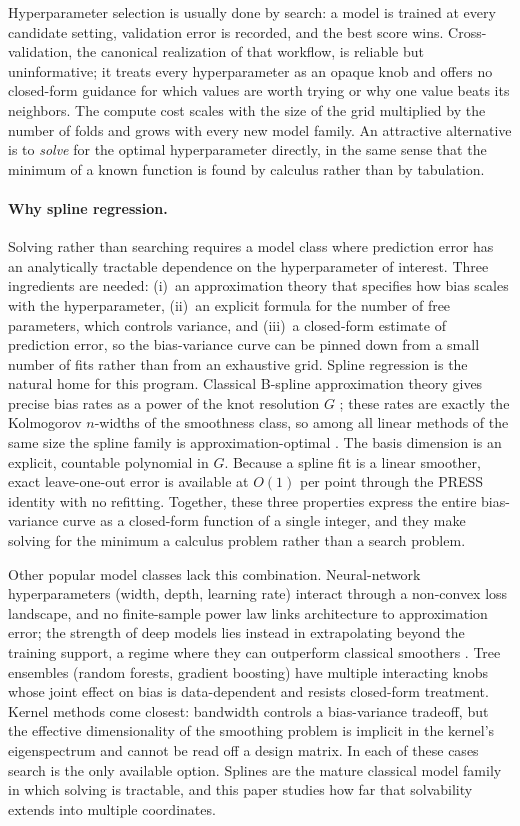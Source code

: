 \documentclass{article}
\begin{document}
Hyperparameter selection is usually done by search: a model is trained at every candidate setting, validation error is recorded, and the best score wins. Cross-validation, the canonical realization of that workflow, is reliable but uninformative; it treats every hyperparameter as an opaque knob and offers no closed-form guidance for which values are worth trying or why one value beats its neighbors. The compute cost scales with the size of the grid multiplied by the number of folds and grows with every new model family. An attractive alternative is to \emph{solve} for the optimal hyperparameter directly, in the same sense that the minimum of a known function is found by calculus rather than by tabulation.

\paragraph{Why spline regression.}
Solving rather than searching requires a model class where prediction error has an analytically tractable dependence on the hyperparameter of interest. Three ingredients are needed: (i)~an approximation theory that specifies how bias scales with the hyperparameter, (ii)~an explicit formula for the number of free parameters, which controls variance, and (iii)~a closed-form estimate of prediction error, so the bias-variance curve can be pinned down from a small number of fits rather than from an exhaustive grid. Spline regression is the natural home for this program. Classical B-spline approximation theory gives precise bias rates as a power of the knot resolution $G$ \citep{deboor2001,schumaker2007}; these rates are exactly the Kolmogorov $n$-widths of the smoothness class, so among all linear methods of the same size the spline family is approximation-optimal \citep{kolmogorov1936,melkman1978,pinkus1985}. The basis dimension is an explicit, countable polynomial in $G$. Because a spline fit is a linear smoother, exact leave-one-out error is available at $O(1)$ per point through the PRESS identity \citep{allen1974} with no refitting. Together, these three properties express the entire bias-variance curve as a closed-form function of a single integer, and they make solving for the minimum a calculus problem rather than a search problem.

Other popular model classes lack this combination. Neural-network hyperparameters (width, depth, learning rate) interact through a non-convex loss landscape, and no finite-sample power law links architecture to approximation error; the strength of deep models lies instead in extrapolating beyond the training support, a regime where they can outperform classical smoothers \citep{bay2024generalization}. Tree ensembles (random forests, gradient boosting) have multiple interacting knobs whose joint effect on bias is data-dependent and resists closed-form treatment. Kernel methods come closest: bandwidth controls a bias-variance tradeoff, but the effective dimensionality of the smoothing problem is implicit in the kernel's eigenspectrum and cannot be read off a design matrix. In each of these cases search is the only available option. Splines are the mature classical model family in which solving is tractable, and this paper studies how far that solvability extends into multiple coordinates.
\end{document}
